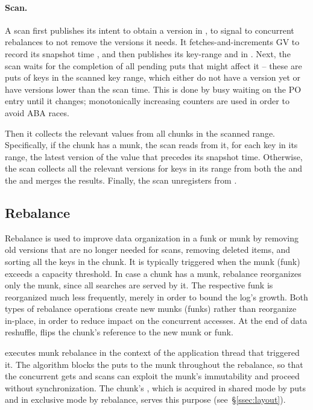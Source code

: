 \paragraph{Scan.}
A scan first publishes its intent to obtain a version in , to 
signal to concurrent rebalances to not remove the versions it needs. It
fetches-and-increments GV to record its snapshot time ,  
and then publishes its key-range and  in .
Next, the scan waits for the completion of all pending puts  
that might affect it  -- these are puts of keys in the scanned key range, which either do not have a version yet or have versions lower than the scan time.
This is done by busy waiting on the PO entry until it changes; monotonically increasing counters are used 
in order to avoid ABA races. 

Then it collects the relevant values from all chunks in the scanned range.
Specifically, if the chunk has a munk, the scan reads from it, for each key in its range, 
the latest version of the value that precedes its snapshot time.
Otherwise, the scan collects all the relevant versions for keys in its range from both 
the    and the  and merges the results.
Finally, the scan unregisters from .

\subsection{Rebalance}
\label{ssec:rebalance}

Rebalance is used to improve data organization in a funk or munk by removing old versions that are no longer needed 
for scans, removing deleted items, and sorting all the keys in the chunk. It is typically triggered when the munk (funk)
exceeds a capacity threshold.   
In case a chunk has a munk, rebalance reorganizes only the munk, since all searches are served by it. 
The respective funk is reorganized much less frequently, merely in order to bound the log's growth. 
Both types of rebalance operations create new munks (funks) rather than reorganize in-place, 
in order to reduce impact on the concurrent accesses. At the end of data reshuffle, \sys\/ flips the 
chunk's reference to the new munk or funk.

\sys\/ executes munk rebalance in the context of the application thread that triggered it. The algorithm blocks 
the puts to the munk throughout the rebalance, so that the concurrent gets and scans can exploit the munk's 
immutability and proceed without synchronization. The chunk's , which 
is acquired in shared mode by puts and in exclusive mode by rebalance, serves this purpose (see~\S\ref{ssec:layout}).   

